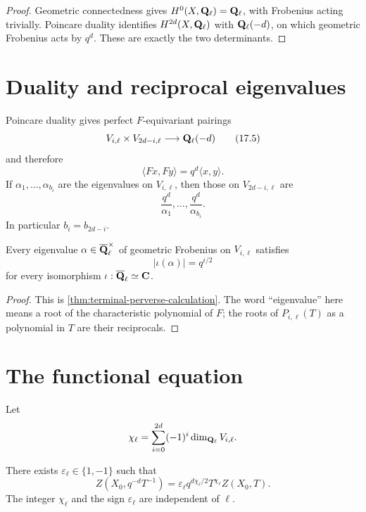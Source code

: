 \begin{proof}
Geometric connectedness gives
\(H^0(X,\mathbf Q_\ell)=\mathbf Q_\ell\), with Frobenius acting trivially.  Poincare duality
identifies \(H^{2d}(X,\mathbf Q_\ell)\) with \(\mathbf Q_\ell(-d)\), on which geometric Frobenius
acts by \(q^d\).  These are exactly the two determinants.
\end{proof}

\section{Duality and reciprocal eigenvalues}

Poincare duality gives perfect \(F\)-equivariant pairings
\[
  V_{i,\ell}\times V_{2d-i,\ell}
  \longrightarrow\mathbf Q_\ell(-d)
\tag{17.5}\label{eq:poincare-X}
\]
and therefore
\[
  \langle Fx,Fy\rangle=q^d\langle x,y\rangle.
\tag{17.6}\label{eq:poincare-similitude}
\]
If \(\alpha_1,\ldots,\alpha_{b_i}\) are the eigenvalues on \(V_{i,\ell}\),
then those on \(V_{2d-i,\ell}\) are
\[
  \frac{q^d}{\alpha_1},\ldots,\frac{q^d}{\alpha_{b_i}}.
\tag{17.7}\label{eq:reciprocal-eigenvalues}
\]
In particular \(b_i=b_{2d-i}\).

\begin{proposition}
\label{prop:all-realization-purity}
Every eigenvalue \(\alpha\in\overline{\mathbf Q}_\ell^\times\) of geometric Frobenius on
\(V_{i,\ell}\) satisfies
\[
  |\iota(\alpha)|=q^{i/2}
\tag{17.8}\label{eq:smooth-proper-purity}
\]
for every isomorphism \(\iota:\overline{\mathbf Q}_\ell\simeq\mathbf C\).
\end{proposition}

\begin{proof}
This is \cref{thm:terminal-perverse-calculation}.  The word “eigenvalue” here
means a root of the characteristic polynomial of \(F\); the roots of
\(P_{i,\ell}(T)\) as a polynomial in \(T\) are their reciprocals.
\end{proof}

\section{The functional equation}

Let
\[
  \chi_\ell=\sum_{i=0}^{2d}(-1)^i\dim_{\mathbf Q_\ell}V_{i,\ell}.
\]

\begin{theorem}
\label{thm:zeta-functional-equation}
There exists \(\varepsilon_\ell\in\{1,-1\}\) such that
\[
  Z(X_0,q^{-d}T^{-1})
  =
  \varepsilon_\ell q^{d\chi_\ell/2}
  T^{\chi_\ell}Z(X_0,T).
\tag{17.9}\label{eq:zeta-functional-equation}
\]
The integer \(\chi_\ell\) and the sign \(\varepsilon_\ell\) are independent
of \(\ell\).
\end{theorem}

